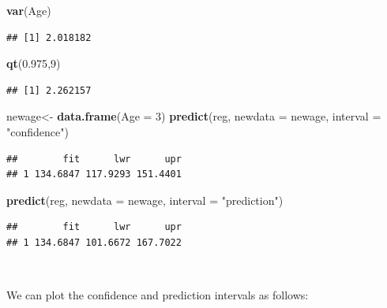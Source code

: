 \documentclass[
]{article}
\newenvironment{Shaded}{\begin{snugshade}}{\end{snugshade}}
\newcommand{\AttributeTok}[1]{\textcolor[rgb]{0.13,0.29,0.53}{#1}}
\newcommand{\DecValTok}[1]{\textcolor[rgb]{0.00,0.00,0.81}{#1}}
\newcommand{\FloatTok}[1]{\textcolor[rgb]{0.00,0.00,0.81}{#1}}
\newcommand{\FunctionTok}[1]{\textcolor[rgb]{0.13,0.29,0.53}{\textbf{#1}}}
\newcommand{\NormalTok}[1]{#1}
\newcommand{\OtherTok}[1]{\textcolor[rgb]{0.56,0.35,0.01}{#1}}
\newcommand{\StringTok}[1]{\textcolor[rgb]{0.31,0.60,0.02}{#1}}
\begin{document}
\begin{Shaded}
\begin{Highlighting}[]
\FunctionTok{var}\NormalTok{(Age)}
\end{Highlighting}
\end{Shaded}

\begin{verbatim}
## [1] 2.018182
\end{verbatim}

\begin{Shaded}
\begin{Highlighting}[]
\FunctionTok{qt}\NormalTok{(}\FloatTok{0.975}\NormalTok{,}\DecValTok{9}\NormalTok{)}
\end{Highlighting}
\end{Shaded}

\begin{verbatim}
## [1] 2.262157
\end{verbatim}

\begin{Shaded}
\begin{Highlighting}[]
\NormalTok{newage}\OtherTok{\textless{}{-}} \FunctionTok{data.frame}\NormalTok{(}\AttributeTok{Age =} \DecValTok{3}\NormalTok{)}
\FunctionTok{predict}\NormalTok{(reg, }\AttributeTok{newdata =}\NormalTok{ newage, }\AttributeTok{interval =} \StringTok{"confidence"}\NormalTok{)}
\end{Highlighting}
\end{Shaded}

\begin{verbatim}
##        fit      lwr      upr
## 1 134.6847 117.9293 151.4401
\end{verbatim}

\begin{Shaded}
\begin{Highlighting}[]
\FunctionTok{predict}\NormalTok{(reg, }\AttributeTok{newdata =}\NormalTok{ newage, }\AttributeTok{interval =} \StringTok{"prediction"}\NormalTok{)}
\end{Highlighting}
\end{Shaded}

\begin{verbatim}
##        fit      lwr      upr
## 1 134.6847 101.6672 167.7022
\end{verbatim}

\(~\)

We can plot the confidence and prediction intervals as follows:

\end{document}
